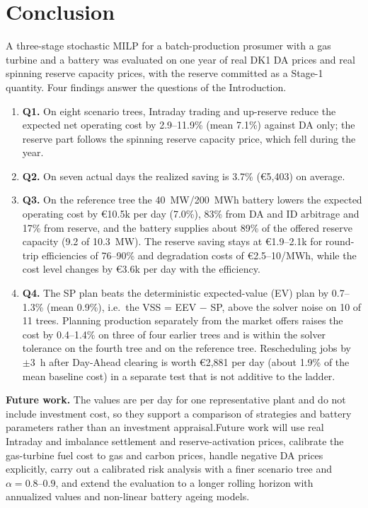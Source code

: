 \documentclass[5p,times,twocolumn]{elsarticle}
\begin{document}
\section{Conclusion}
\label{sec:conclusion}
A three-stage stochastic MILP for a batch-production prosumer with a gas turbine and a battery was evaluated on one year of real DK1 DA prices and real spinning reserve capacity prices, with the reserve committed as a Stage-1 quantity. Four findings answer the questions of the Introduction.
\begin{enumerate}
    \item \textbf{Q1.} On eight scenario trees, Intraday trading and up-reserve reduce the expected net operating cost by 2.9--11.9\% (mean 7.1\%) against DA only; the reserve part follows the spinning reserve capacity price, which fell during the year.
    \item \textbf{Q2.} On seven actual days the realized saving is 3.7\% (\euro 5,403) on average.
    \item \textbf{Q3.} On the reference tree the 40~MW/200~MWh battery lowers the expected operating cost by \euro 10.5k per day (7.0\%), 83\% from DA and ID arbitrage and 17\% from reserve, and the battery supplies about 89\% of the offered reserve capacity (9.2 of 10.3~MW). The reserve saving stays at \euro 1.9--2.1k for round-trip efficiencies of 76--90\% and degradation costs of \euro 2.5--10/MWh, while the cost level changes by \euro 3.6k per day with the efficiency.
    \item \textbf{Q4.} The SP plan beats the deterministic expected-value (EV) plan by 0.7--1.3\% (mean 0.9\%), i.e.\ the VSS = EEV $-$ SP, above the solver noise on 10 of 11 trees. Planning production separately from the market offers raises the cost by 0.4--1.4\% on three of four earlier trees and is within the solver tolerance on the fourth tree and on the reference tree. Rescheduling jobs by $\pm3$~h after Day-Ahead clearing is worth \euro 2,881 per day (about 1.9\% of the mean baseline cost) in a separate test that is not additive to the ladder.
\end{enumerate}
\textbf{Future work.} The values are per day for one representative plant and do not include investment cost, so they support a comparison of strategies and battery parameters rather than an investment appraisal.Future work will use real Intraday and imbalance settlement and reserve-activation prices, calibrate the
gas-turbine fuel cost to gas and carbon prices, handle negative DA  prices
explicitly, carry out a calibrated risk analysis with a finer scenario tree and
$\alpha=0.8$--$0.9$, and extend the evaluation to a longer rolling horizon with
annualized values and non-linear battery ageing models. 
\end{document}
